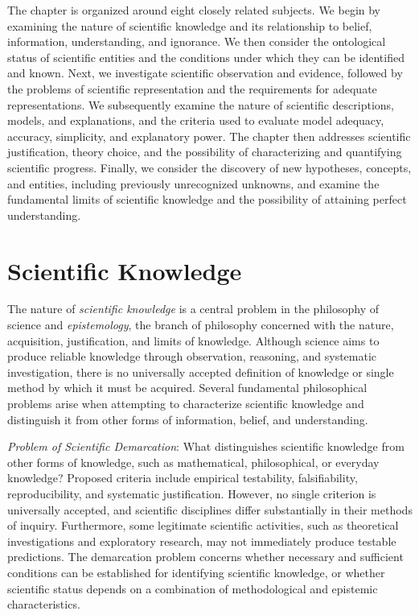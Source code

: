 The chapter is organized around eight closely related subjects. We begin by examining the nature of scientific knowledge and its relationship to belief, information, understanding, and ignorance. We then consider the ontological status of scientific entities and the conditions under which they can be identified and known. Next, we investigate scientific observation and evidence, followed by the problems of scientific representation and the requirements for adequate representations. We subsequently examine the nature of scientific descriptions, models, and explanations, and the criteria used to evaluate model adequacy, accuracy, simplicity, and explanatory power. The chapter then addresses scientific justification, theory choice, and the possibility of characterizing and quantifying scientific progress. Finally, we consider the discovery of new hypotheses, concepts, and entities, including previously unrecognized unknowns, and examine the fundamental limits of scientific knowledge and the possibility of attaining perfect understanding. 

%
%

\section{Scientific Knowledge}
\label{sec:scientific_knowledge}

The nature of \emph{scientific knowledge} is a central problem in the philosophy of science and \emph{epistemology}, the branch of philosophy concerned with the nature, acquisition, justification, and limits of knowledge. Although science aims to produce reliable knowledge through observation, reasoning, and systematic investigation, there is no universally accepted definition of knowledge or single method by which it must be acquired. Several fundamental philosophical problems arise when attempting to characterize scientific knowledge and distinguish it from other forms of information, belief, and understanding.

\emph{Problem of Scientific Demarcation}: What distinguishes scientific knowledge from other forms of knowledge, such as mathematical, philosophical, or everyday knowledge? Proposed criteria include empirical testability, falsifiability, reproducibility, and systematic justification. However, no single criterion is universally accepted, and scientific disciplines differ substantially in their methods of inquiry. Furthermore, some legitimate scientific activities, such as theoretical investigations and exploratory research, may not immediately produce testable predictions. The demarcation problem concerns whether necessary and sufficient conditions can be established for identifying scientific knowledge, or whether scientific status depends on a combination of methodological and epistemic characteristics.


